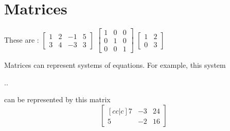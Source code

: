 \section{Matrices}

These are :
\(
\begin{bmatrix}
  1 & 2 & -1 & 5\\
  3 & 4 & -3 & 3
\end{bmatrix}
\)
%
\hfil 
%
\(
\begin{bmatrix}
  1 & 0 & 0 \\
  0 & 1 & 0 \\
  0 & 0 & 1
\end{bmatrix}
\)
%
\hfil 
%
\(
\begin{bmatrix}
  1 & 2 \\
  0 & 3 
\end{bmatrix}
\)

Matrices can represent systems of equations.
For example, this system
\begin{center}
    \large
    \sysdelim..
\end{center}

can be represented by this  matrix
{
    \large
    \vspace{2\baselineskip}
    \[
    \begin{bmatrix}[cc|c]
    7 & -3 & 24\\
    5 & -2 & 16
    \end{bmatrix}
    \]
}